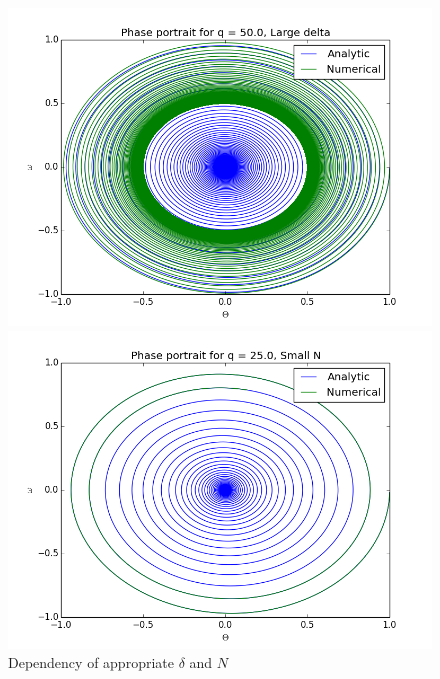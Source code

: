 \documentclass[12pt]{article}
\begin{document}
\begin{figure}[]
\centering
\begin{minipage}[t]{0.45\textwidth}
\includegraphics[width=\textwidth]{Largedelta.png}
\end{minipage}
\begin{minipage}[t]{0.45\textwidth}
\includegraphics[width=\textwidth]{SmallN.png}
\end{minipage}
\caption{Dependency of appropriate $\delta$ and $N$}
\label{fig:3}   
\end{figure}
\end{document}
